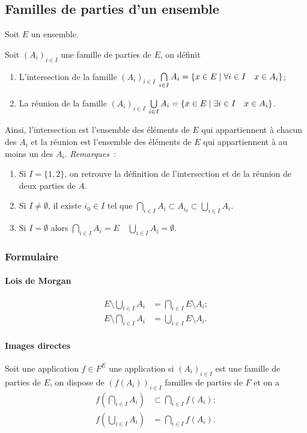 \subsection{Familles de parties d'un ensemble}
\label{chap3-subsec:familledeparties}
Soit \(E\) un ensemble.
\begin{defdef}
    Soit \((A_i)_{i \in I}\) une famille de parties de \(E\), on définit
    \begin{enumerate}
        \item L'intersection de la famille \((A_i)_{i \in I}\)  \(\bigcap\limits_{i \in I} A_i = \left\{x \in E\mathrel{}\middle|\mathrel{}\forall i \in I \quad x \in A_i\right\}\);
        \item La réunion de la famille \((A_i)_{i \in I}\)  \(\bigcup\limits_{i \in I} A_i = \left\{x \in E\mathrel{}\middle|\mathrel{}\exists i \in I \quad x \in A_i\right\}\).
    \end{enumerate}
\end{defdef}
Ainsi, l'intersection est l'ensemble des éléments de \(E\) qui appartiennent à chacun des \(A_i\) et la réunion est l'ensemble des éléments de \(E\) qui appartiennent à au moins un des \(A_i\).
\emph{Remarques}~:
\begin{enumerate}
    \item Si \(I=\{1,2\}\), on retrouve la définition de l'intersection et de la réunion de deux parties de \(A\).
    \item Si \(I \neq \emptyset\), il existe \(i_0 \in I\) tel que \(\bigcap\limits_{i \in I} A_i \subset A_{i_0} \subset \bigcup\limits_{i \in I} A_i\).
    \item Si \(I = \emptyset\) alors \(\bigcap\limits_{i \in I} A_i =E \quad \bigcup\limits_{i \in I} A_i=\emptyset\).
\end{enumerate}
\subsubsection{Formulaire}
\label{chap3-subsubsec:formulaireensemble}
\paragraph{Lois de Morgan}
\label{chap3-par:morgan}
\begin{align}
    E \setminus \bigcup\limits_{i \in I} A_i &= \bigcap\limits_{i \in I} E \setminus A_i;\\
    E \setminus \bigcap\limits_{i \in I} A_i &= \bigcup\limits_{i \in I} E \setminus A_i.
\end{align}
\paragraph{Images directes}
\label{chap3-par:imagedir}
Soit une application \(f \in F^E\) une application si \((A_i)_{i \in I}\) est une famille de parties de \(E\), on dispose de \((f(A_i))_{i \in I}\) familles de parties de \(F\) et on a 
\begin{align}
    f \left(\bigcap\limits_{i \in I} A_i\right) &\subset \bigcap\limits_{i \in I} f(A_i);\\
    f \left(\bigcup\limits_{i \in I} A_i\right) &= \bigcap\limits_{i \in I} f(A_i).
\end{align}
